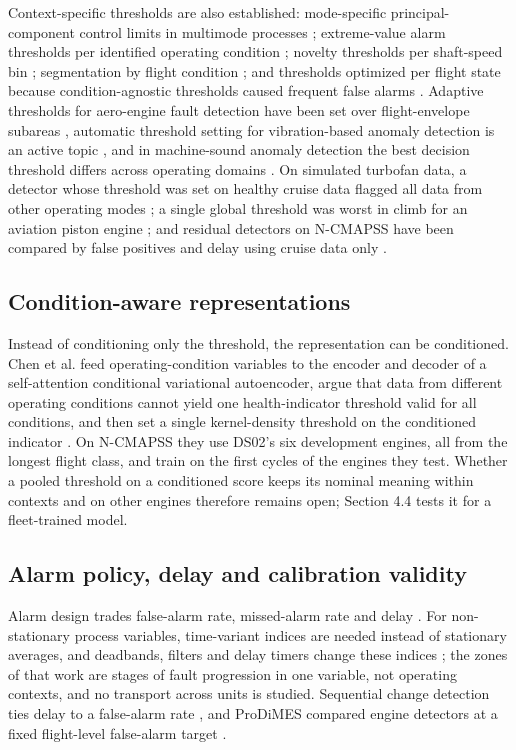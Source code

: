 \documentclass[preprint,11pt,a4paper]{elsarticle}
\begin{document}
Context-specific thresholds are also established: mode-specific principal-component control limits in multimode processes \cite{N8}; extreme-value alarm thresholds per identified operating condition \cite{N22}; novelty thresholds per shaft-speed bin \cite{N27}; segmentation by flight condition \cite{N25}; and thresholds optimized per flight state because condition-agnostic thresholds caused frequent false alarms \cite{N26}. Adaptive thresholds for aero-engine fault detection have been set over flight-envelope subareas \cite{ref6}, automatic threshold setting for vibration-based anomaly detection is an active topic \cite{N14}, and in machine-sound anomaly detection the best decision threshold differs across operating domains \cite{N37}. On simulated turbofan data, a detector whose threshold was set on healthy cruise data flagged all data from other operating modes \cite{N23}; a single global threshold was worst in climb for an aviation piston engine \cite{N43}; and residual detectors on N-CMAPSS have been compared by false positives and delay using cruise data only \cite{N42}.

\subsection{Condition-aware representations}

Instead of conditioning only the threshold, the representation can be conditioned. Chen et al. feed operating-condition variables to the encoder and decoder of a self-attention conditional variational autoencoder, argue that data from different operating conditions cannot yield one health-indicator threshold valid for all conditions, and then set a single kernel-density threshold on the conditioned indicator \cite{N38}. On N-CMAPSS they use DS02's six development engines, all from the longest flight class, and train on the first cycles of the engines they test. Whether a pooled threshold on a conditioned score keeps its nominal meaning within contexts and on other engines therefore remains open; Section 4.4 tests it for a fleet-trained model.

\subsection{Alarm policy, delay and calibration validity}

Alarm design trades false-alarm rate, missed-alarm rate and delay \cite{N32}. For non-stationary process variables, time-variant indices are needed instead of stationary averages, and deadbands, filters and delay timers change these indices \cite{N39,N40}; the zones of that work are stages of fault progression in one variable, not operating contexts, and no transport across units is studied. Sequential change detection ties delay to a false-alarm rate \cite{N17}, and ProDiMES compared engine detectors at a fixed flight-level false-alarm target \cite{N24}.
\end{document}
